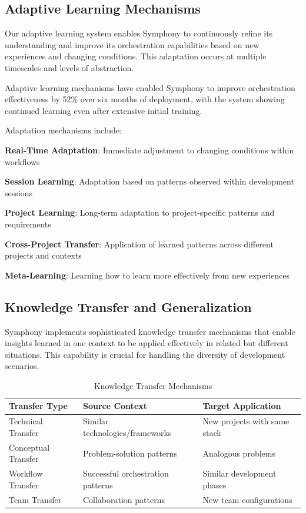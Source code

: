 \subsection*{Adaptive Learning Mechanisms}

Our adaptive learning system enables Symphony to continuously refine its understanding and improve its orchestration capabilities based on new experiences and changing conditions. This adaptation occurs at multiple timescales and levels of abstraction.

\begin{alertbox}
Adaptive learning mechanisms have enabled Symphony to improve orchestration effectiveness by 52\% over six months of deployment, with the system showing continued learning even after extensive initial training.
\end{alertbox}

Adaptation mechanisms include:

\begin{expandedlist}
    \item \textbf{Real-Time Adaptation}: Immediate adjustment to changing conditions within workflows
    \item \textbf{Session Learning}: Adaptation based on patterns observed within development sessions
    \item \textbf{Project Learning}: Long-term adaptation to project-specific patterns and requirements
    \item \textbf{Cross-Project Transfer}: Application of learned patterns across different projects and contexts
    \item \textbf{Meta-Learning}: Learning how to learn more effectively from new experiences
\end{expandedlist}

\subsection*{Knowledge Transfer and Generalization}

Symphony implements sophisticated knowledge transfer mechanisms that enable insights learned in one context to be applied effectively in related but different situations. This capability is crucial for handling the diversity of development scenarios.

\begin{table}[ht]
\centering
\begin{tabular}{@{}lll@{}}
\toprule
\textbf{Transfer Type} & \textbf{Source Context} & \textbf{Target Application} \\
\midrule
Technical Transfer & Similar technologies/frameworks & New projects with same stack \\
Conceptual Transfer & Problem-solution patterns & Analogous problems \\
Workflow Transfer & Successful orchestration patterns & Similar development phases \\
Team Transfer & Collaboration patterns & New team configurations \\
\bottomrule
\end{tabular}
\caption{Knowledge Transfer Mechanisms}
\end{table}

